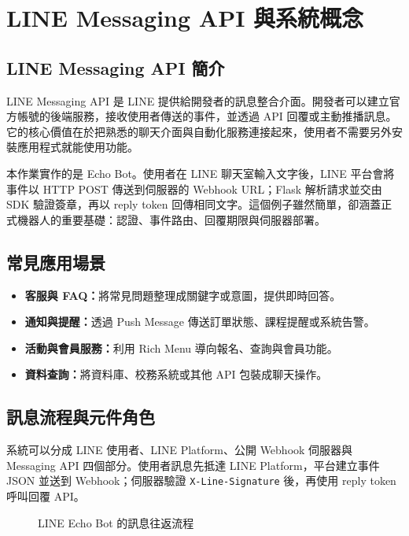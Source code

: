 \chapter{LINE Messaging API 與系統概念}

\section{LINE Messaging API 簡介}
LINE Messaging API 是 LINE 提供給開發者的訊息整合介面。開發者可以建立官方帳號的後端服務，接收使用者傳送的事件，並透過 API 回覆或主動推播訊息。它的核心價值在於把熟悉的聊天介面與自動化服務連接起來，使用者不需要另外安裝應用程式就能使用功能。

本作業實作的是 Echo Bot。使用者在 LINE 聊天室輸入文字後，LINE 平台會將事件以 HTTP POST 傳送到伺服器的 Webhook URL；Flask 解析請求並交由 SDK 驗證簽章，再以 reply token 回傳相同文字。這個例子雖然簡單，卻涵蓋正式機器人的重要基礎：認證、事件路由、回覆期限與伺服器部署。

\section{常見應用場景}
\begin{itemize}[leftmargin=2.5em]
    \item \textbf{客服與 FAQ：}將常見問題整理成關鍵字或意圖，提供即時回答。
    \item \textbf{通知與提醒：}透過 Push Message 傳送訂單狀態、課程提醒或系統告警。
    \item \textbf{活動與會員服務：}利用 Rich Menu 導向報名、查詢與會員功能。
    \item \textbf{資料查詢：}將資料庫、校務系統或其他 API 包裝成聊天操作。
\end{itemize}

\section{訊息流程與元件角色}
系統可以分成 LINE 使用者、LINE Platform、公開 Webhook 伺服器與 Messaging API 四個部分。使用者訊息先抵達 LINE Platform，平台建立事件 JSON 並送到 Webhook；伺服器驗證 \texttt{X-Line-Signature} 後，再使用 reply token 呼叫回覆 API。

\begin{figure}[H]
    \centering
    \caption{LINE Echo Bot 的訊息往返流程}
    \label{fig:message-flow}
\end{figure}

